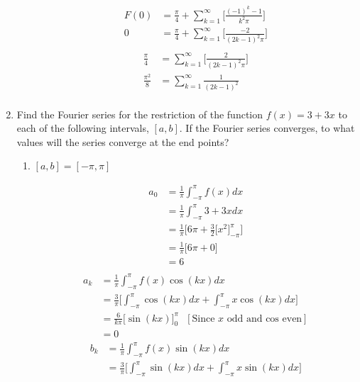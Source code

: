 \documentclass{article}
\begin{document}
\begin{enumerate}
\begin{enumerate}
\begin{multicols}{2}
\noindent
\begin{align*}
        F(0) &= \frac{\pi}{4} + \sum^{\infty}_{k=1}\Bigg[ \frac{(-1)^k-1}{k^2\pi} \Bigg] \\ 
        0 &= \frac{\pi}{4} + \sum^{\infty}_{k=1}\Bigg[ \frac{-2}{(2k - 1)^2\pi} \Bigg] \\
        \end{align*}
        \begin{align*}
         \frac{\pi}{4} &= \sum^{\infty}_{k=1}\Bigg[ \frac{2}{(2k - 1)^2\pi} \Bigg] \\
         \frac{\pi^2}{8} &= \sum^{\infty}_{k=1} \frac{1}{(2k - 1)^2} \\
\end{align*}
\end{multicols}
\end{enumerate}
\newpage
\item Find the Fourier series for the restriction of the function $f(x) = 3 + 3x$ to each of the following intervals, $[a,b]$. If the Fourier series converges, to what values will the series converge at the end points?
\begin{enumerate}
\item $[a,b] = [-\pi, \pi] $
\begin{multicols}{2}
\noindent
\begin{align*}
    a_0 &= \frac{1}{\pi} \int_{-\pi}^{\pi}f(x) dx \\
    &= \frac{1}{\pi} \int_{-\pi}^{\pi}3 + 3x dx \\
    &= \frac{1}{\pi} \Bigg[6\pi +  \frac{3}{2}\Big[x^2\Big]^{\pi}_{-\pi}\Bigg] \\
    &= \frac{1}{\pi} \Bigg[6\pi + 0 \Bigg] \\
    &= 6\\
\end{align*}
\begin{align*}
    a_k &= \frac{1}{\pi} \int_{-\pi}^{\pi}f(x)\cos(kx) dx \\
    &= \frac{3}{\pi}\Bigg[ \int_{-\pi}^{\pi}\cos(kx) dx + \int_{-\pi}^{\pi}x\cos(kx) dx \Bigg] \\
    &= \frac{6}{k\pi}\Big[\sin(kx)\Big]_{0}^{\pi} \: \: \: [\text{Since $x$ odd and cos even}] \\
    &= 0
\end{align*}
\begin{align*}
    b_k &= \frac{1}{\pi} \int_{-\pi}^{\pi}f(x)\sin(kx) dx \\
    &= \frac{3}{\pi}\Bigg[ \int_{-\pi}^{\pi}\sin(kx) dx + \int_{-\pi}^{\pi}x\sin(kx) dx \Bigg] \\

\end{align*}
\end{multicols}
\end{enumerate}
\end{enumerate}
\end{document}
